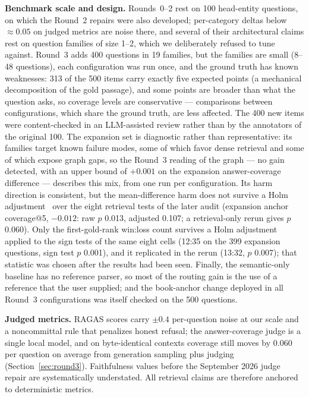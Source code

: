 \textbf{Benchmark scale and design.} Rounds~0--2 rest on 100
head-entity questions, on which the Round~2 repairs were also developed;
per-category deltas below $\approx 0.05$ on judged metrics are noise
there, and several of their architectural claims rest on question
families of size 1--2, which we deliberately refused to tune against.
Round~3 adds 400 questions in 19 families, but the families are small
(8--48 questions), each configuration was run once, and the ground truth
has known weaknesses: 313 of the 500 items carry exactly five expected
points (a mechanical decomposition of the gold passage), and some points
are broader than what the question asks, so coverage levels are
conservative --- comparisons between configurations, which share the
ground truth, are less affected. The 400 new items were content-checked
in an LLM-assisted review rather than by the annotators of the original
100. The expansion set is diagnostic rather than representative: its
families target known failure modes, some of which favor dense
retrieval and some of which expose graph gaps, so the Round~3 reading
of the graph --- no gain detected, with an upper bound of $+0.001$ on
the expansion answer-coverage difference --- describes this mix, from
one run per configuration. Its harm direction is consistent, but the
mean-difference harm does not survive a Holm adjustment~\cite{holm1979}
over the eight retrieval tests of the later audit (expansion anchor
coverage@5, $-0.012$: raw $p$ 0.013, adjusted 0.107; a retrieval-only
rerun gives $p$ 0.060). Only the first-gold-rank win:loss count survives a Holm adjustment applied to the sign tests of the same eight cells (12:35 on the 399 expansion questions, sign test $p$
0.001), and it replicated in the rerun (13:32, $p$ 0.007); that
statistic was chosen after the results had been seen. Finally, the
semantic-only baseline has no reference parser, so most of the routing gain is the use of a reference that the
user supplied; and the book-anchor change deployed in all Round~3
configurations was itself checked on the 500 questions.

\textbf{Judged metrics.} RAGAS scores carry $\pm 0.4$ per-question
noise at our scale and a noncommittal rule that penalizes honest
refusal; the answer-coverage judge is a single local model, and on
byte-identical contexts coverage still moves by 0.060 per question on
average from generation sampling plus judging (Section~\ref{sec:round3}). Faithfulness values before the
September 2026 judge repair are systematically understated. All
retrieval claims are therefore anchored to deterministic metrics.

